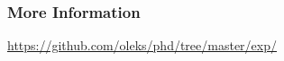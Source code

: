 \begin{frame}

\frametitle{More Information}

\begin{center}

\url{https://github.com/oleks/phd/tree/master/exp/}

\end{center}

\end{frame}

